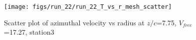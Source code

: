 \begin{figure}[H]
\centering
\texttt{[image: figs/run\_22/run\_22\_T\_vs\_r\_mesh\_scatter]}
\caption{Scatter plot of azimuthal velocity vs radius at $z/c$=7.75, $V_{free}$=17.27, station3}
\label{fig:run_22_T_vs_r_mesh_scatter}
\end{figure}


